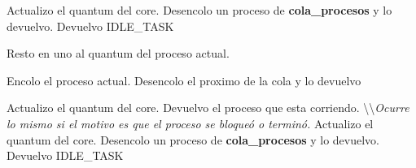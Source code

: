\begin{algorithmic}

			\State Actualizo el quantum del core.
			\State Desencolo un proceso de \textbf{cola\_procesos} y lo devuelvo.
		\Else
			\State Devuelvo IDLE\_TASK
		
		\EndIf
		\newline
	
	\Else
			\State Resto en uno al quantum del proceso actual.

				\newline
					\State Encolo el proceso actual.
					\State Desencolo el proximo de la cola y lo devuelvo
				\EndIf

				\State Actualizo el quantum del core.
			\Else
				\State Devuelvo el proceso que esta corriendo.
			\EndIf
		\Else
			\State \textbackslash \textbackslash \textit{Ocurre lo mismo si el motivo es que el proceso se bloqueó o terminó.}
			\newline
				\State Actualizo el quantum del core.
				\State Desencolo un proceso de \textbf{cola\_procesos} y lo devuelvo.
			\Else
				\State Devuelvo IDLE\_TASK
			\EndIf
		\EndIf
	\EndIf
\EndFunction	
\end{algorithmic}
